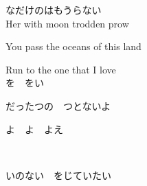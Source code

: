 {なだけのはもうらない
\\

Her with moon trodden prow

You pass the oceans of this land

Run to the one that I love
\\

を　をい

だったつの　つとないよ

よ　よ　よえ

　　


いのない　をじていたい

}